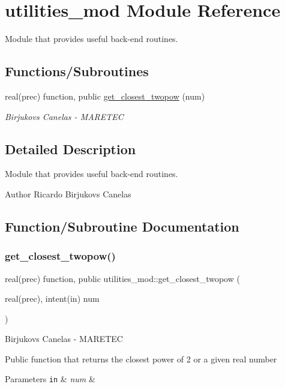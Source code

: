 \hypertarget{namespaceutilities__mod}{}\section{utilities\+\_\+mod Module Reference}
\label{namespaceutilities__mod}


Module that provides useful back-\/end routines.  


\subsection*{Functions/\+Subroutines}
\begin{DoxyCompactItemize}
\item 
real(prec) function, public \hyperlink{namespaceutilities__mod_a683f93677348e11d331c1c37c66caf7a}{get\+\_\+closest\+\_\+twopow} (num)
\begin{DoxyCompactList}\small\item\em Birjukovs Canelas -\/ M\+A\+R\+E\+T\+EC \end{DoxyCompactList}\end{DoxyCompactItemize}


\subsection{Detailed Description}
Module that provides useful back-\/end routines. 

\begin{DoxyAuthor}{Author}
Ricardo Birjukovs Canelas 
\end{DoxyAuthor}


\subsection{Function/\+Subroutine Documentation}
\mbox{\label{namespaceutilities__mod_a683f93677348e11d331c1c37c66caf7a}} 
\subsubsection{\texorpdfstring{get\+\_\+closest\+\_\+twopow()}{get\_closest\_twopow()}}
{\footnotesize\ttfamily real(prec) function, public utilities\+\_\+mod\+::get\+\_\+closest\+\_\+twopow (\begin{DoxyParamCaption}\item[{real(prec), intent(in)}]{num }\end{DoxyParamCaption})}



Birjukovs Canelas -\/ M\+A\+R\+E\+T\+EC 

Public function that returns the closest power of 2 or a given real number 
\begin{DoxyParams}[1]{Parameters}
\mbox{\tt in}  & {\em num} & \\
\hline
\end{DoxyParams}
